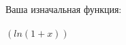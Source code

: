 \documentclass[12pt,a4paper]{scrartcl}
\begin{document}
\\\\Ваша изначальная функция: \\
\\{${(ln{({1}+{x})})}$}
\end{document}
